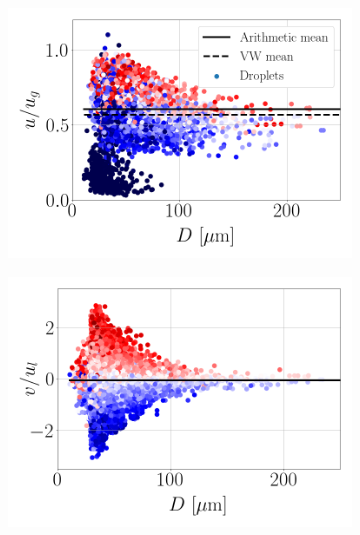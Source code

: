 \begin{figure}[ht]
   \vspace*{-0.2in}
\begin{subfigure}[b]{0.3\textwidth}
	\flushleft
   \includegraphics[scale=0.2]{./part2_developments/figures_ch5_resolved_JICF/SPRAY_characterization/velocities/scatter_ux_D.png}
\end{subfigure}
\hfill
\begin{subfigure}[b]{0.3\textwidth}
	\flushleft
   \includegraphics[scale=0.2]{./part2_developments/figures_ch5_resolved_JICF/SPRAY_characterization/velocities/scatter_uy_D.png}
\end{subfigure}
\hfill
\begin{subfigure}[b]{0.3\textwidth}
	\flushleft

\end{subfigure}
\end{figure}
